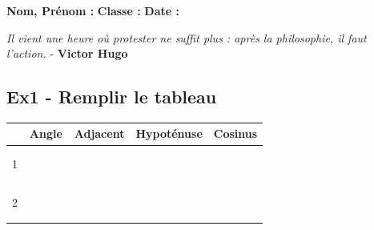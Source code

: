 \documentclass[12pt]{article}
\begin{document}

\textbf{Nom, Prénom :} \hspace{8cm} \textbf{Classe :} \hspace{3cm} \textbf{Date :}

\begin{center}
  \textit{Il vient une heure où protester ne suffit plus : après la philosophie, il faut l’action.}  - \textbf{Victor Hugo}

\end{center}



\begin{multicols}{2}
\subsection*{Ex1 - Remplir le tableau}

\begin{center}
  \begin{tabular}{| l || c | c | c | c |}
    \hline
    & Angle & Adjacent & Hypoténuse & Cosinus \phantom{azerty}\\
    \hline  
    1 &
    $ \phantom{ \dfrac{\dfrac{azerty}{a} }{a}} $ & $ \phantom{ \dfrac{\dfrac{azerty}{a} }{a}} $ &
    $ \phantom{ \dfrac{\dfrac{azerty}{a} }{a}} $ & $ \phantom{ \dfrac{\dfrac{azerty}{a} }{a}} $ \\
    \hline
    2 &
    $ \phantom{ \dfrac{\dfrac{azerty}{a} }{a}} $ & $ \phantom{ \dfrac{\dfrac{azerty}{a} }{a}} $ &
    $ \phantom{ \dfrac{\dfrac{azerty}{a} }{a}} $ & $ \phantom{ \dfrac{\dfrac{azerty}{a} }{a}} $ \\
    \hline
  \end{tabular}
\end{center}


\end{multicols}
\end{document}
